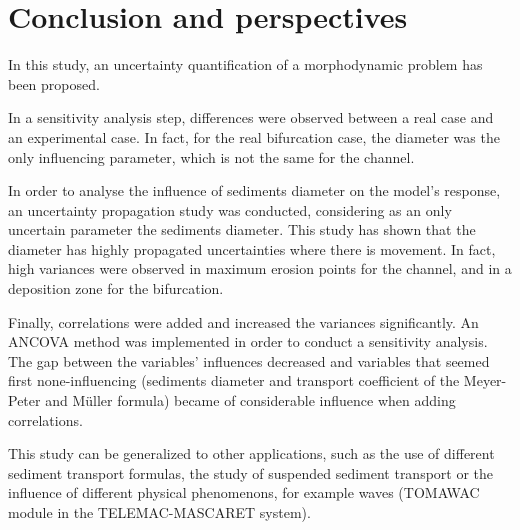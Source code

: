 \section{Conclusion and perspectives}
In this study, an uncertainty quantification of a morphodynamic problem has been proposed.

In a sensitivity analysis step, differences were observed between a real case and an experimental case. In fact, for the real bifurcation case, the diameter was the only influencing parameter, which is not the same for the channel. 

In order to analyse the influence of sediments diameter on the model's response, an uncertainty propagation study was conducted, considering as an only uncertain parameter the sediments diameter. This study has shown that the diameter has highly propagated uncertainties where there is movement. In fact, high variances were observed in maximum erosion points for the channel, and in a deposition zone for the bifurcation. 

Finally, correlations were added and increased the variances significantly. An ANCOVA method was implemented in order to conduct a sensitivity analysis. The gap between the variables' influences decreased and variables that seemed first none-influencing (sediments diameter and transport coefficient of the Meyer-Peter and Müller formula) became of considerable influence when adding correlations. 

This study can be generalized to other applications, such as the use of different sediment transport formulas, the study of suspended sediment transport or the influence of different physical phenomenons, for example waves (TOMAWAC module in the TELEMAC-MASCARET system).
